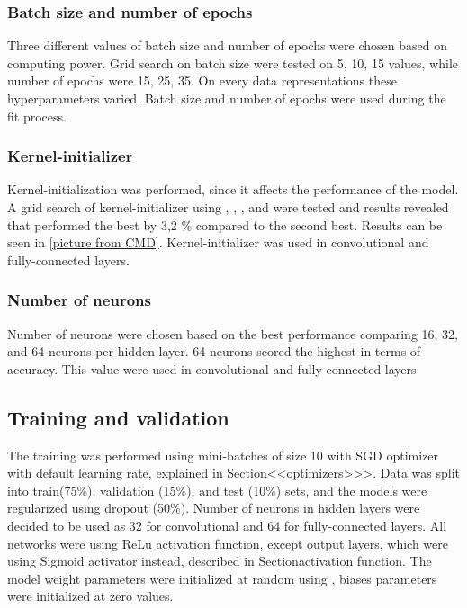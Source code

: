 \subsubsection{Batch size and number of epochs}
Three different values of batch size and number of epochs were chosen based on computing power. Grid search on batch size were tested on 5, 10, 15 values, while number of epochs were 15, 25, 35. On every data representations these hyperparameters varied. Batch size and number of epochs were used during the fit process.

\subsubsection{Kernel-initializer}
Kernel-initialization was performed, since it affects the performance of the model.
A grid search of kernel-initializer using , , ,  and  were tested and results revealed that  performed the best by 3,2 \% compared to the second best. Results can be seen in \ref{picture from CMD}. Kernel-initializer was used in convolutional and fully-connected layers.

\subsubsection{Number of neurons}
Number of neurons were chosen based on the best performance comparing 16, 32, and 64 neurons per hidden layer. 64 neurons scored the highest in terms of accuracy. This value were used in convolutional and fully connected layers

\subsection{Training and validation}
The training was performed using mini-batches of size 10 with SGD optimizer with default learning rate, explained in Section<<optimizers>>>. Data was split into train(75\%), validation (15\%), and test (10\%) sets, and the models were regularized using dropout (50\%). Number of neurons in hidden layers were decided to be used as 32 for convolutional and 64 for fully-connected layers. All networks were using ReLu activation function, except output layers, which were using Sigmoid activator instead, described in Section{activation function}.
The model weight parameters were initialized at random using , biases parameters were initialized at zero values.


